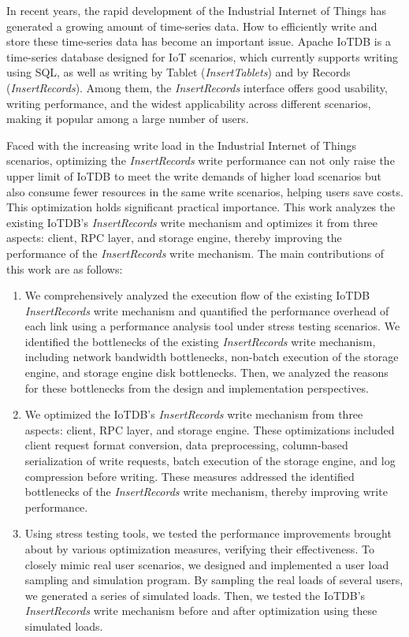 \begin{abstract*}

  In recent years, the rapid development of the Industrial Internet of Things has generated a growing amount of time-series data. How to efficiently write and store these time-series data has become an important issue. Apache IoTDB is a time-series database designed for IoT scenarios, which currently supports writing using SQL, as well as writing by Tablet (\emph{InsertTablets}) and by Records (\emph{InsertRecords}). Among them, the \emph{InsertRecords} interface offers good usability, writing performance, and the widest applicability across different scenarios, making it popular among a large number of users.

  Faced with the increasing write load in the Industrial Internet of Things scenarios, optimizing the \emph{InsertRecords} write performance can not only raise the upper limit of IoTDB to meet the write demands of higher load scenarios but also consume fewer resources in the same write scenarios, helping users save costs. This optimization holds significant practical importance. This work analyzes the existing IoTDB's \emph{InsertRecords} write mechanism and optimizes it from three aspects: client, RPC layer, and storage engine, thereby improving the performance of the \emph{InsertRecords} write mechanism. The main contributions of this work are as follows:
  
  \begin{enumerate}
  \item We comprehensively analyzed the execution flow of the existing IoTDB \emph{InsertRecords} write mechanism and quantified the performance overhead of each link using a performance analysis tool under stress testing scenarios. We identified the bottlenecks of the existing \emph{InsertRecords} write mechanism, including network bandwidth bottlenecks, non-batch execution of the storage engine, and storage engine disk bottlenecks. Then, we analyzed the reasons for these bottlenecks from the design and implementation perspectives.
  \item We optimized the IoTDB's \emph{InsertRecords} write mechanism from three aspects: client, RPC layer, and storage engine. These optimizations included client request format conversion, data preprocessing, column-based serialization of write requests, batch execution of the storage engine, and log compression before writing. These measures addressed the identified bottlenecks of the \emph{InsertRecords} write mechanism, thereby improving write performance.
  \item Using stress testing tools, we tested the performance improvements brought about by various optimization measures, verifying their effectiveness. To closely mimic real user scenarios, we designed and implemented a user load sampling and simulation program. By sampling the real loads of several users, we generated a series of simulated loads. Then, we tested the IoTDB's \emph{InsertRecords} write mechanism before and after optimization using these simulated loads.
  \end{enumerate}
  

\end{abstract*}
